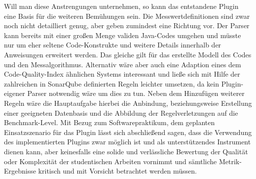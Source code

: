 \documentclass[gb,ngerman]{stthesis}
\begin{document}
		Will man diese Anstrengungen unternehmen, so kann das entstandene Plugin eine Basis für die weiteren Bemühungen sein. Die Messwertdefinitionen sind zwar noch nicht detailliert genug, aber geben zumindest eine Richtung vor. Der Parser kann bereits mit einer großen Menge validen Java-Codes umgehen und müsste nur um eher seltene Code-Konstrukte und weitere Details innerhalb der Anweisungen erweitert werden. Das gleiche gilt für das erstellte Modell des Codes und den Messalgorithmus. \newline
		Alternativ wäre aber auch eine Adaption eines dem Code-Quality-Index ähnlichen Systems interessant und ließe sich mit Hilfe der zahlreichen in SonarQube definierten Regeln leichter umsetzen, da kein Plugin-eigener Parser notwendig wäre um dies zu tun. Neben dem Hinzufügen weiterer Regeln wäre die Hauptaufgabe hierbei die Anbindung, beziehungsweise Erstellung einer geeigneten Datenbasis und die Abbildung der Regelverletzungen auf die Benchmark-Level. \newline
		Mit Bezug zum Softwarepraktikum, dem geplanten Einsatzszenario für das Plugin lässt sich abschließend sagen, dass die Verwendung des implementierten Plugins zwar möglich ist und als unterstützendes Instrument dienen kann, aber keinesfalls eine solide und verlässliche Bewertung der Qualität oder Komplexität der studentischen Arbeiten vornimmt und sämtliche Metrik-Ergebnisse kritisch und mit Vorsicht betrachtet werden müssen.
		
  	\backmatter
  
  	\appendix
  	
  
\end{document}
